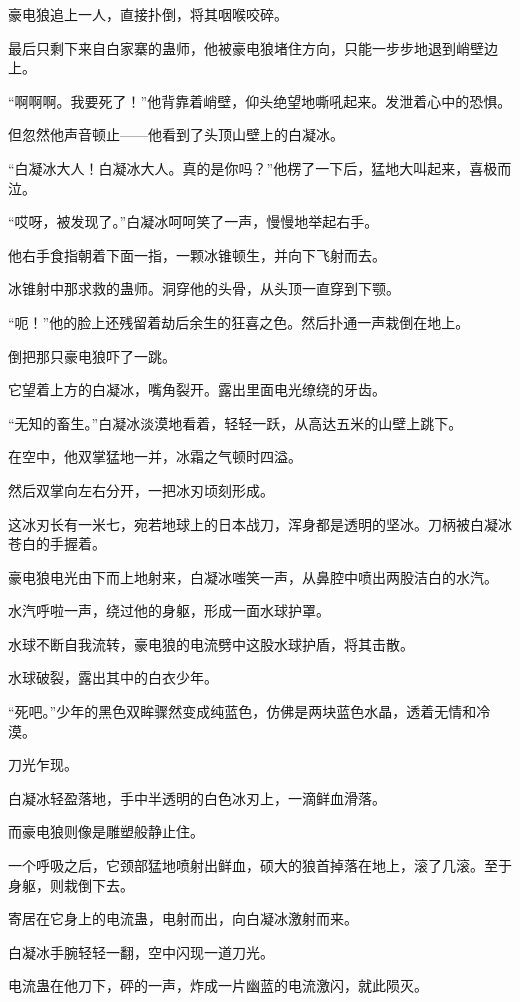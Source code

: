 \begin{this_body}
豪电狼追上一人，直接扑倒，将其咽喉咬碎。

最后只剩下来自白家寨的蛊师，他被豪电狼堵住方向，只能一步步地退到峭壁边上。

“啊啊啊。我要死了！”他背靠着峭壁，仰头绝望地嘶吼起来。发泄着心中的恐惧。

但忽然他声音顿止——他看到了头顶山壁上的白凝冰。

“白凝冰大人！白凝冰大人。真的是你吗？”他楞了一下后，猛地大叫起来，喜极而泣。

“哎呀，被发现了。”白凝冰呵呵笑了一声，慢慢地举起右手。

他右手食指朝着下面一指，一颗冰锥顿生，并向下飞射而去。

冰锥射中那求救的蛊师。洞穿他的头骨，从头顶一直穿到下颚。

“呃！”他的脸上还残留着劫后余生的狂喜之色。然后扑通一声栽倒在地上。

倒把那只豪电狼吓了一跳。

它望着上方的白凝冰，嘴角裂开。露出里面电光缭绕的牙齿。

“无知的畜生。”白凝冰淡漠地看着，轻轻一跃，从高达五米的山壁上跳下。

在空中，他双掌猛地一并，冰霜之气顿时四溢。

然后双掌向左右分开，一把冰刃顷刻形成。

这冰刃长有一米七，宛若地球上的日本战刀，浑身都是透明的坚冰。刀柄被白凝冰苍白的手握着。

豪电狼电光由下而上地射来，白凝冰嗤笑一声，从鼻腔中喷出两股洁白的水汽。

水汽呼啦一声，绕过他的身躯，形成一面水球护罩。

水球不断自我流转，豪电狼的电流劈中这股水球护盾，将其击散。

水球破裂，露出其中的白衣少年。

“死吧。”少年的黑色双眸骤然变成纯蓝色，仿佛是两块蓝色水晶，透着无情和冷漠。

刀光乍现。

白凝冰轻盈落地，手中半透明的白色冰刃上，一滴鲜血滑落。

而豪电狼则像是雕塑般静止住。

一个呼吸之后，它颈部猛地喷射出鲜血，硕大的狼首掉落在地上，滚了几滚。至于身躯，则栽倒下去。

寄居在它身上的电流蛊，电射而出，向白凝冰激射而来。

白凝冰手腕轻轻一翻，空中闪现一道刀光。

电流蛊在他刀下，砰的一声，炸成一片幽蓝的电流激闪，就此陨灭。


\end{this_body}
